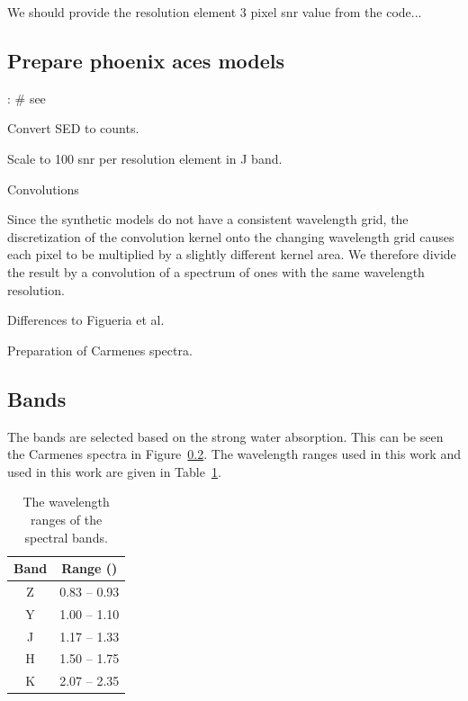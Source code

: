 We should provide the resolution element 3 pixel snr value from the code...


\subsection{Prepare phoenix aces models}:
\# see~\citet{figueira_radial_2016}

Convert SED to counts.


Scale to 100 snr per resolution element in J band.

Convolutions


Since the synthetic models do not have a consistent wavelength grid, the discretization of the convolution kernel onto the changing wavelength grid causes each pixel to be multiplied by a slightly different kernel area. We therefore divide the result by a convolution of a spectrum of ones with the same wavelength resolution.

Differences to Figueria et al.


Preparation of Carmenes spectra.



\subsection{Bands}
The bands are selected based on the strong water absorption. This can be seen the Carmenes spectra in Figure~\ref{}. The wavelength ranges used in this work \citet{figueira_radial_2016} and used in this work are given in Table~\ref{tab:band_ranges}.
\begin{table}
    \centering
    \caption{The wavelength ranges of the \nir{} spectral bands.}
    \begin{tabular}{cc}
        \toprule
        Band & Range (\um{})\\
        \midrule
        Z & 0.83 -- 0.93\\
        Y & 1.00 -- 1.10\\
        J & 1.17 -- 1.33\\
        H & 1.50 -- 1.75\\
        K & 2.07 -- 2.35\\
        \bottomrule
    \end{tabular}
    \label{tab:band_ranges}
\end{table}



